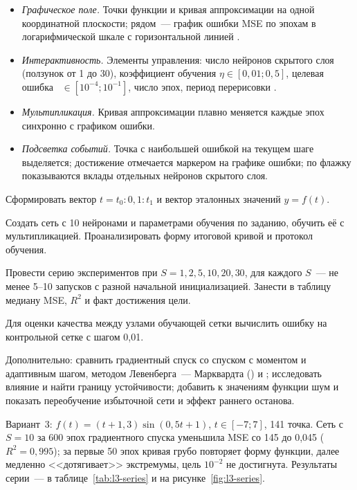 \begin{itemize}
\item \emph{Графическое поле.} Точки функции и кривая аппроксимации на одной координатной плоскости; рядом~--- график ошибки MSE по эпохам в логарифмической шкале с горизонтальной линией .
\item \emph{Интерактивность.} Элементы управления: число нейронов скрытого слоя (ползунок от 1 до 30), коэффициент обучения $\eta \in [0,01; 0,5]$, целевая ошибка ~$\in [10^{-4}; 10^{-1}]$, число эпох, период перерисовки .
\item \emph{Мультипликация.} Кривая аппроксимации плавно меняется каждые  эпох синхронно с графиком ошибки.
\item \emph{Подсветка событий.} Точка с наибольшей ошибкой на текущем шаге выделяется; достижение  отмечается маркером на графике ошибки; по флажку показываются вклады отдельных нейронов скрытого слоя.
\end{itemize}

\begin{steps}
\item Сформировать вектор $t = t_0 : 0,1 : t_1$ и вектор эталонных значений $y = f(t)$.
\item Создать сеть с 10 нейронами и параметрами обучения по заданию, обучить её с мультипликацией.
Проанализировать форму итоговой кривой и протокол обучения.
\item Провести серию экспериментов при $S = 1, 2, 5, 10, 20, 30$, для каждого $S$~--- не менее 5--10 запусков
с разной начальной инициализацией. Занести в таблицу медиану MSE, $R^2$ и факт достижения цели.
\item Для оценки качества между узлами обучающей сетки вычислить ошибку на контрольной сетке с шагом 0,01.
\item Дополнительно: сравнить градиентный спуск со спуском с моментом и адаптивным шагом, методом
Левенберга~--- Марквардта () и ; исследовать влияние
 и найти границу устойчивости; добавить к значениям функции шум и показать переобучение
избыточной сети и эффект раннего останова.
\end{steps}

Вариант~3: $f(t) = (t + 1,3)\sin(0,5t + 1)$, $t \in [-7; 7]$, 141 точка. Сеть с $S = 10$ за 600 эпох
градиентного спуска уменьшила MSE со 145 до 0,045 ($R^2 = 0,995$); за первые 50 эпох кривая грубо
повторяет форму функции, далее медленно <<дотягивает>> экстремумы, цель $10^{-2}$ не достигнута.
Результаты серии~--- в таблице~\ref{tab:l3-series} и на рисунке~\ref{fig:l3-series}.

